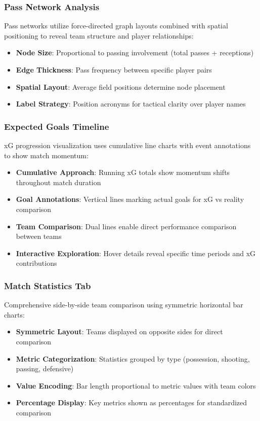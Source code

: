 \documentclass[12pt,a4paper]{article}
\begin{document}
\subsubsection{Pass Network Analysis}
Pass networks utilize force-directed graph layouts combined with spatial positioning to reveal team structure and player relationships:
\begin{itemize}
    \item \textbf{Node Size}: Proportional to passing involvement (total passes + receptions)
    \item \textbf{Edge Thickness}: Pass frequency between specific player pairs
    \item \textbf{Spatial Layout}: Average field positions determine node placement
    \item \textbf{Label Strategy}: Position acronyms for tactical clarity over player names
\end{itemize}



\subsubsection{Expected Goals Timeline}
xG progression visualization uses cumulative line charts with event annotations to show match momentum:
\begin{itemize}
    \item \textbf{Cumulative Approach}: Running xG totals show momentum shifts throughout match duration
    \item \textbf{Goal Annotations}: Vertical lines marking actual goals for xG vs reality comparison
    \item \textbf{Team Comparison}: Dual lines enable direct performance comparison between teams
    \item \textbf{Interactive Exploration}: Hover details reveal specific time periods and xG contributions
\end{itemize}



\subsubsection{Match Statistics Tab}
Comprehensive side-by-side team comparison using symmetric horizontal bar charts:
\begin{itemize}
    \item \textbf{Symmetric Layout}: Teams displayed on opposite sides for direct comparison
    \item \textbf{Metric Categorization}: Statistics grouped by type (possession, shooting, passing, defensive)
    \item \textbf{Value Encoding}: Bar length proportional to metric values with team colors
    \item \textbf{Percentage Display}: Key metrics shown as percentages for standardized comparison
\end{itemize}
\end{document}
